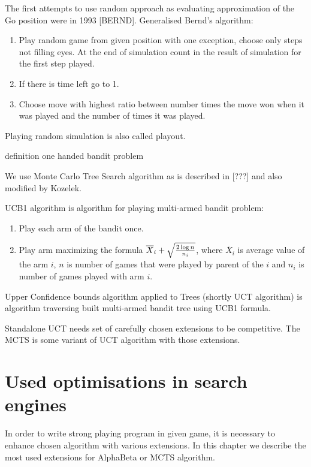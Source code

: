 \documentclass[12pt,titlepage,fleqn]{report}
\begin{document}
The first attempts to use random approach as evaluating approximation of the Go
position were in 1993 [BERND]. Generalised Bernd's algorithm:

\begin{enumerate}
\item Play random game from given position with one exception, choose only
	  steps not filling eyes. At the end of simulation count in the result of
	  simulation for the first step played.
\item If there is time left go to 1.
\item Choose move with highest ratio between number times the move won when it
	  was played and the number of times it was played.
\end{enumerate}

Playing random simulation is also called playout.

definition one handed bandit problem

We use Monte Carlo Tree Search algorithm as is described in [???] and also
modified by Kozelek.


UCB1 algorithm is algorithm for playing multi-armed bandit problem:

\begin{enumerate}
\item Play each arm of the bandit once.
\item Play arm maximizing the formula $\overline X_i + \sqrt{2 \log n \over n_i}$,
	  where $\overline X_i$ is average value of the arm $i$, $n$ is number
	  of games that were played by parent of the $i$ and $n_i$ is number of
	  games played with arm $i$.
\end{enumerate}

Upper Confidence bounds algorithm applied to Trees (shortly UCT algorithm) is
algorithm traversing built multi-armed bandit tree using UCB1 formula.

	

Standalone UCT needs set of carefully chosen extensions to be competitive. The
MCTS is some variant of UCT algorithm with those extensions.

\chapter{Used optimisations in search engines}

In order to write strong playing program in given game, it is necessary to
enhance chosen algorithm with various extensions. In this chapter we describe
the most used extensions for AlphaBeta or MCTS algorithm.
\end{document}
